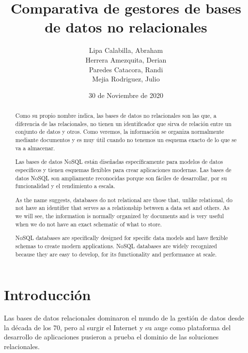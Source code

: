 \documentclass[twocolumn]{article}
\newenvironment{poliabstract}[1]
   {\renewcommand{\abstractname}{#1}\begin{abstract}}
   {\end{abstract}}
\begin{document}
\title{Comparativa de gestores de bases de datos no relacionales}
\author{Lipa Calabilla, Abraham\\Herrera Amezquita,
Derian  \\Paredes Catacora, Randi \\Mejia Rodriguez, Julio}


\date{30 de Noviembre de 2020}

\maketitle

\begin{poliabstract}{Resumen} 
  Como su propio nombre indica, las bases de datos no 
  relacionales son las que, a diferencia de las relacionales,
   no tienen un identificador que sirva de relación entre un 
   conjunto de datos y otros. Como veremos, la información
    se organiza normalmente mediante documentos y es muy
     útil cuando no tenemos un esquema exacto de lo que se va a almacenar.

     Las bases de datos NoSQL están diseñadas específicamente
     para modelos de datos específicos y tienen esquemas flexibles 
     para crear aplicaciones modernas. Las bases de datos NoSQL son 
     ampliamente reconocidas porque son fáciles de desarrollar, por 
     su funcionalidad y el rendimiento a escala.
  
\end{poliabstract}

\begin{poliabstract}{Abstract} 
  As the name suggests, databases do not
  relational are those that, unlike relational,
   do not have an identifier that serves as a relationship between a
   data set and others. As we will see, the information
    is normally organized by documents and is very
     useful when we do not have an exact schematic of what to store.

     NoSQL databases are specifically designed
     for specific data models and have flexible schemas
     to create modern applications. NoSQL databases are
     widely recognized because they are easy to develop, for
     its functionality and performance at scale.
\end{poliabstract}

\section{Introducción}
Las bases de datos relacionales dominaron el 
mundo de la gestión de datos desde la década de los 
70, pero al surgir el  Internet y su auge como 
plataforma del desarrollo de aplicaciones pusieron a prueba  el dominio de las 
soluciones relacionales.
\end{document}
